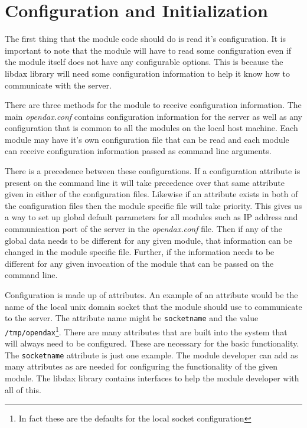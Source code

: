 \chapter{Configuration and Initialization}

The first thing that the module code should do is read it's configuration.  It
is important to note that the module will have to read some configuration even
if the module itself does not have any configurable options. This is because the
libdax library will need some configuration information to help it know how to
communicate with the server.

There are three methods for the module to receive configuration information.
The main \textit{opendax.conf} contains configuration information for the server
as well as any configuration that is common to all the modules on the local host
machine.  Each module may have it's own configuration file that can be read and
each module can receive configuration information passed as command line
arguments.

There is a precedence between these configurations.  If a configuration
attribute is present on the command line it will take precedence over that same
attribute given in either of the configuration files.  Likewise if an attribute
exists in both of the configuration files then the module specific file will
take priority.  This gives us a way to set up global default parameters for all
modules such as IP address and communication port of the server in the
\textit{opendax.conf} file.  Then if any of the global data needs to be
different for any given module, that information can be changed in the module
specific file.  Further, if the information needs to be different for any given
invocation of the module that can be passed on the command line.

Configuration is made up of attributes.  An example of an attribute would be the
name of the local unix domain socket that the module should use to communicate
to the server.  The attribute name might be \texttt{socketname} and the value
\texttt{/tmp/opendax}\footnote{In fact these are the defaults for the local
socket configuration}.  There are many attributes that are built into the system
that will always need to be configured.  These are necessary for the basic
functionality.  The \texttt{socketname} attribute is just one example.  The
module developer can add as many attributes as are needed for configuring the
functionality of the given module.  The libdax library contains interfaces to
help the module developer with all of this.

